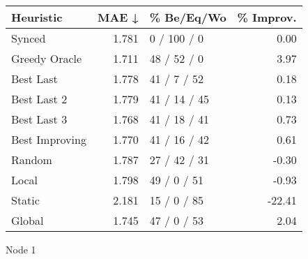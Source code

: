 \begin{tabular}{lrlr}
\toprule
\textbf{Heuristic} & \textbf{MAE ↓} & \textbf{\% Be/Eq/Wo} & \textbf{\% Improv.} \\
\midrule
            Synced &          1.781 &          0 / 100 / 0 &                0.00 \\
     Greedy Oracle &          1.711 &          48 / 52 / 0 &                3.97 \\
         Best Last &          1.778 &          41 / 7 / 52 &                0.18 \\
       Best Last 2 &          1.779 &         41 / 14 / 45 &                0.13 \\
       Best Last 3 &          1.768 &         41 / 18 / 41 &                0.73 \\
    Best Improving &          1.770 &         41 / 16 / 42 &                0.61 \\
            Random &          1.787 &         27 / 42 / 31 &               -0.30 \\
             Local &          1.798 &          49 / 0 / 51 &               -0.93 \\
            Static &          2.181 &          15 / 0 / 85 &              -22.41 \\
            Global &          1.745 &          47 / 0 / 53 &                2.04 \\
\bottomrule
\end{tabular}
\caption{Node 1}
\label{tab:ds_iid_lr05_le1_bs2_1}
